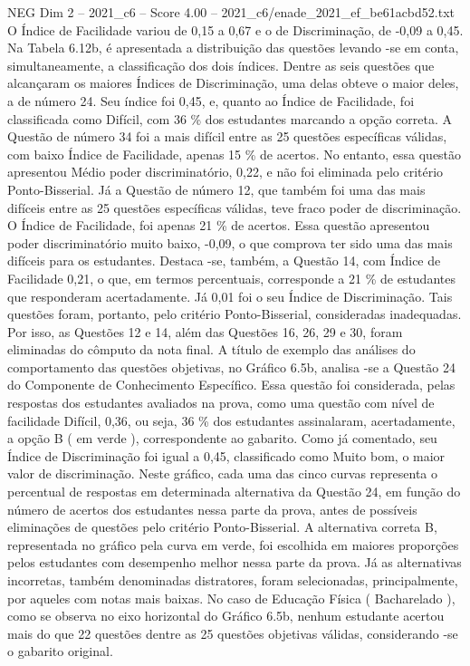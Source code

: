 \begin{textsample}{NEG Dim 2 – 2021\_c6 – Score 4.00 – 2021\_c6/enade\_2021\_ef\_be61acbd52.txt}
O Índice de Facilidade variou de 0,15 a 0,67 e o de Discriminação, de -0,09 a 0,45.
Na Tabela 6.12b, é apresentada a distribuição das questões levando -se em conta, simultaneamente, a classificação dos dois índices.
Dentre as seis questões que alcançaram os maiores Índices de Discriminação, uma delas obteve o maior deles, a de número 24.
Seu índice foi 0,45, e, quanto ao Índice de Facilidade, foi classificada como Difícil, com 36 \% dos estudantes marcando a opção correta.
A Questão de número 34 foi a mais difícil entre as 25 questões específicas válidas, com baixo Índice de Facilidade, apenas 15 \% de acertos.
No entanto, essa questão apresentou Médio poder discriminatório, 0,22, e não foi eliminada pelo critério Ponto-Bisserial.
Já a Questão de número 12, que também foi uma das mais difíceis entre as 25 questões específicas válidas, teve fraco poder de discriminação.
O Índice de Facilidade, foi apenas 21 \% de acertos.
Essa questão apresentou poder discriminatório muito baixo, -0,09, o que comprova ter sido uma das mais difíceis para os estudantes.
Destaca -se, também, a Questão 14, com Índice de Facilidade 0,21, o que, em termos percentuais, corresponde a 21 \% de estudantes que responderam acertadamente.
Já 0,01 foi o seu Índice de Discriminação.
Tais questões foram, portanto, pelo critério Ponto-Bisserial, consideradas inadequadas.
Por isso, as Questões 12 e 14, além das Questões 16, 26, 29 e 30, foram eliminadas do cômputo da nota final.
A título de exemplo das análises do comportamento das questões objetivas, no Gráfico 6.5b, analisa -se a Questão 24 do Componente de Conhecimento Específico.
Essa questão foi considerada, pelas respostas dos estudantes avaliados na prova, como uma questão com nível de facilidade Difícil, 0,36, ou seja, 36 \% dos estudantes assinalaram, acertadamente, a opção B ( em verde ), correspondente ao gabarito.
Como já comentado, seu Índice de Discriminação foi igual a 0,45, classificado como Muito bom, o maior valor de discriminação.
Neste gráfico, cada uma das cinco curvas representa o percentual de respostas em determinada alternativa da Questão 24, em função do número de acertos dos estudantes nessa parte da prova, antes de possíveis eliminações de questões pelo critério Ponto-Bisserial.
A alternativa correta B, representada no gráfico pela curva em verde, foi escolhida em maiores proporções pelos estudantes com desempenho melhor nessa parte da prova.
Já as alternativas incorretas, também denominadas distratores, foram selecionadas, principalmente, por aqueles com notas mais baixas.
No caso de Educação Física ( Bacharelado ), como se observa no eixo horizontal do Gráfico 6.5b, nenhum estudante acertou mais do que 22 questões dentre as 25 questões objetivas válidas, considerando -se o gabarito original.

\end{textsample}
